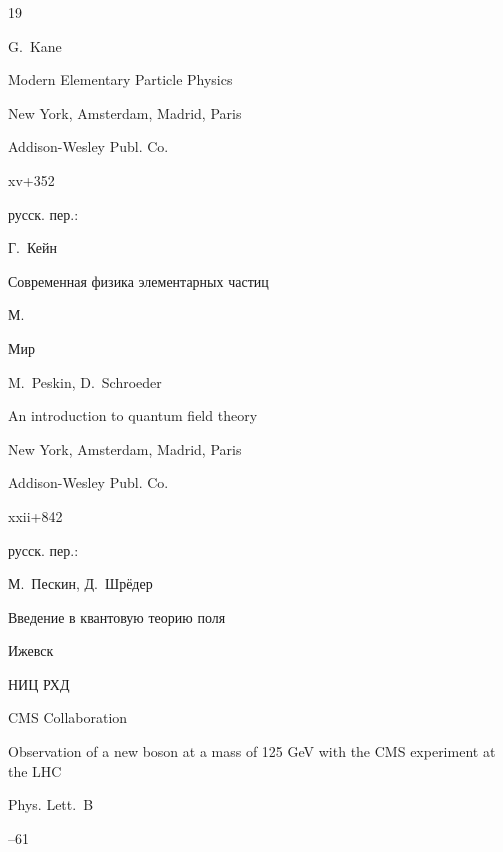 \begin{thebibliography}{19}




\by G.~Kane

\book Modern Elementary Particle Physics

\publaddr New York, Amsterdam, Madrid, Paris

\publ Addison-Wesley Publ. Co.


\totalpages xv+352

\rtransl русск. пер.:~

\by Г.~Кейн

\book Современная физика элементарных частиц

\publaddr М.

\publ Мир






\by M.~Peskin, D.~Schroeder  

\book An introduction to quantum field theory 

\publaddr New York, Amsterdam, Madrid, Paris

\publ Addison-Wesley Publ. Co.


\totalpages xxii+842

\rtransl русск. пер.:~

\by М.~Пескин, Д.~Шрёдер 

\book Введение в квантовую теорию поля

\publaddr Ижевск

\publ НИЦ РХД






\by CMS Collaboration 

\paper 	Observation of a new boson at a mass of 125 GeV with the CMS experiment at the LHC

\jour Phys. Lett.~B




--61





\end{thebibliography}
